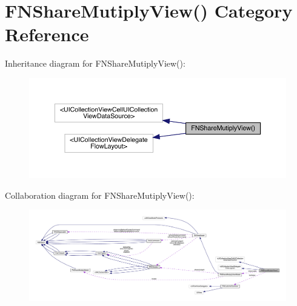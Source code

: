 \hypertarget{category_f_n_share_mutiply_view_07_08}{}\section{F\+N\+Share\+Mutiply\+View() Category Reference}
\label{category_f_n_share_mutiply_view_07_08}


Inheritance diagram for F\+N\+Share\+Mutiply\+View()\+:\nopagebreak
\begin{figure}[H]
\begin{center}
\leavevmode
\includegraphics[width=350pt]{category_f_n_share_mutiply_view_07_08__inherit__graph}
\end{center}
\end{figure}


Collaboration diagram for F\+N\+Share\+Mutiply\+View()\+:\nopagebreak
\begin{figure}[H]
\begin{center}
\leavevmode
\includegraphics[width=350pt]{category_f_n_share_mutiply_view_07_08__coll__graph}
\end{center}
\end{figure}
